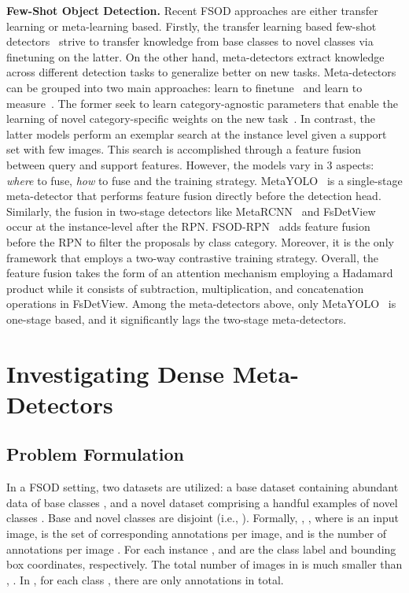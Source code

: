 \documentclass[10pt,twocolumn,letterpaper]{article}
\begin{document}
\begin{table*}[t!]
\end{table*} \textbf{Few-Shot Object Detection.} Recent FSOD approaches are either transfer learning or meta-learning based. Firstly, the transfer learning based few-shot detectors~\cite{LSTD, RepMet, TFA, MPSR, defrcn} strive to transfer knowledge from base classes to novel classes via finetuning on the latter. On the other hand, meta-detectors extract knowledge across different detection tasks to generalize better on new tasks. Meta-detectors can be grouped into two main approaches: learn to finetune~\cite{MetaDet} and learn to measure~\cite{RepMet, FSRW, MetaRCNN, FSOD-RPN, FsDetView, CME, DCNET, DANA, MetaDetR}. The former seek to learn category-agnostic parameters that enable the learning of novel category-specific weights on the new task~\cite{MetaDet}. In contrast, the latter models perform an exemplar search at the instance level given a support set with few images. This search is accomplished through a feature fusion between query and support features. However, the models vary in 3 aspects: \textit{where} to fuse, \textit{how} to fuse and the training strategy. MetaYOLO~\cite{FSRW} is a single-stage meta-detector that performs feature fusion directly before the detection head. Similarly, the fusion in two-stage detectors like MetaRCNN~\cite{MetaRCNN} and FsDetView~\cite{FsDetView} occur at the instance-level after the RPN. FSOD-RPN~\cite{FSOD-RPN} adds feature fusion before the RPN to filter the proposals by class category. Moreover, it is the only framework that employs a two-way contrastive training strategy. Overall, the feature fusion takes the form of an attention mechanism employing a Hadamard product while it consists of subtraction, multiplication, and concatenation operations in FsDetView\cite{FsDetView}. Among the meta-detectors above, only MetaYOLO~\cite{FSRW} is one-stage based, and it significantly lags the two-stage meta-detectors.   


\section{Investigating Dense Meta-Detectors}
\label{sec:investigate}
\subsection{Problem Formulation}
In a FSOD setting, two datasets are utilized: a base dataset  containing abundant data of base classes , and a novel dataset  comprising a handful examples of novel classes .  Base and novel classes are disjoint (i.e., ). Formally, , 
, where  is an input image,  is the set of corresponding annotations per image, and  is the number of annotations per image . For each instance ,  and  are the class label and bounding box coordinates, respectively. The total number of images in  is much smaller than , . In , for each class , there are only  annotations in total. 
\end{document}
